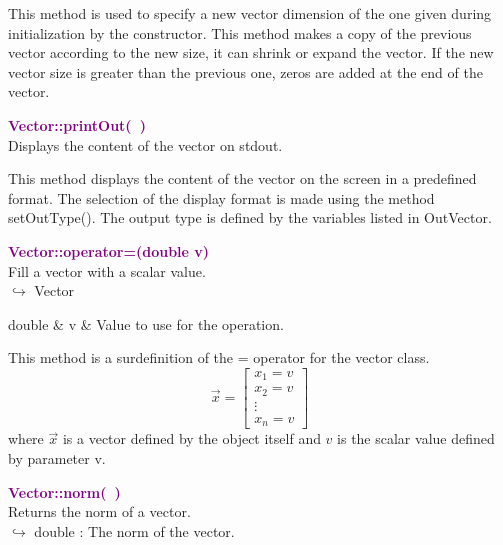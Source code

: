 This method is used to specify a new vector dimension of the one given during initialization by the constructor.
This method makes a copy of the previous vector according to the new size, \ie it can shrink or expand the vector.
If the new vector size is greater than the previous one, zeros are added at the end of the vector.

\textcolor{purple}{\textbf{Vector::printOut(~)}}\label{Vector::printOut()}\\
Displays the content of the vector on stdout.

This method displays the content of the vector on the screen in a predefined format.
The selection of the display format is made using the method setOutType().
The output type is defined by the variables listed in OutVector.

\textcolor{purple}{\textbf{Vector::operator=(double v)}}\label{Vector::operator=(double v)}\\
Fill a vector with a scalar value.\\ \hspace*{10mm}$\hookrightarrow$ Vector

\begin{tcolorbox}[width=\textwidth,myArgs,tabularx={ll|R}]
double & v & Value to use for the operation.
\end{tcolorbox}

This method is a surdefinition of the = operator for the vector class.
\begin{equation*}
\overrightarrow{x}=\left[\begin{array}{c}
  x_{1}=v\\
  x_{2}=v\\
  \vdots\\
  x_{n}=v
  \end{array}\right]
\end{equation*}
where $\overrightarrow{x}$ is a vector defined by the object itself and $v$ is the scalar value defined by parameter v.

\textcolor{purple}{\textbf{Vector::norm(~)}}\label{Vector::norm()}\\
Returns the norm of a vector.\\ \hspace*{10mm}$\hookrightarrow$ double : The norm of the vector.

